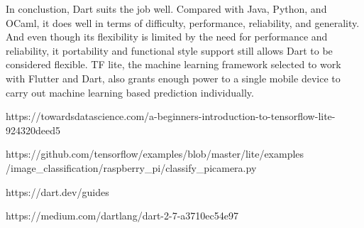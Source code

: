 \documentclass[letterpaper,twocolumn,10pt]{article}
\begin{document}
In conclustion, Dart suits the job well.
Compared with Java, Python, and OCaml, it does well in terms of difficulty, performance, reliability, and generality.
And even though its flexibility is limited by the need for performance and reliability, it portability and functional style support still allows Dart to be considered flexible.
TF lite, the machine learning framework selected to work with Flutter and Dart, also grants enough power to a single mobile device to carry out machine learning based prediction individually.

\newpage



https://towardsdatascience.com/a-beginners-introduction-to-tensorflow-lite-924320deed5

https://github.com/tensorflow/examples/blob/master/lite/examples /image\_classification/raspberry\_pi/classify\_picamera.py

https://dart.dev/guides

https://medium.com/dartlang/dart-2-7-a3710ec54e97

\end{document}
